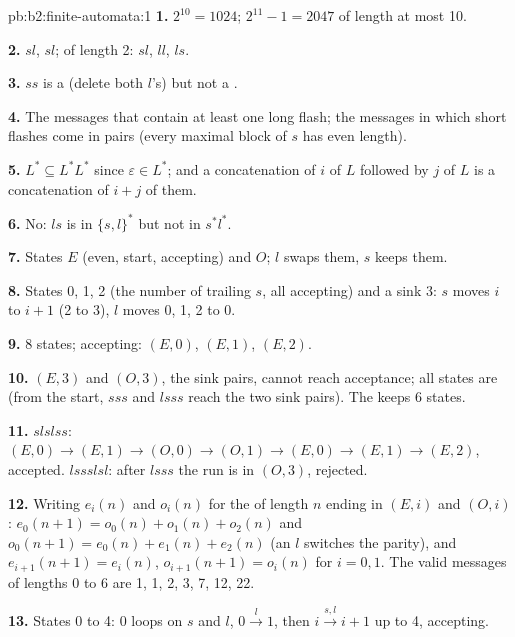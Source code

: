 \begin{solution}{pb:b2:finite-automata:1}
\textbf{1.} $2^{10} = 1024$; $2^{11} - 1 = 2047$ of length at most 10.

\textbf{2.}  $sl$,  $sl$;  of length 2: $sl$, $ll$, $ls$.

\textbf{3.} $ss$ is a  (delete both $l$'s) but not a .

\textbf{4.} The messages that contain at least one long flash; the messages in which short flashes come in pairs
(every maximal block of $s$ has even length).

\textbf{5.} $L^* \subseteq L^* L^*$ since $\varepsilon \in L^*$; and a concatenation of $i$  of $L$ followed by
$j$  of $L$ is a concatenation of $i + j$ of them.

\textbf{6.} No: $ls$ is in $\{s, l\}^*$ but not in $s^* l^*$.

\textbf{7.} States $E$ (even, start, accepting) and $O$; $l$ swaps them, $s$ keeps them.

\textbf{8.} States 0, 1, 2 (the number of trailing $s$, all accepting) and a sink 3: $s$ moves $i$ to $i + 1$ (2 to
3), $l$ moves 0, 1, 2 to 0.

\textbf{9.} 8 states; accepting: $(E, 0)$, $(E, 1)$, $(E, 2)$.

\textbf{10.} $(E, 3)$ and $(O, 3)$, the sink pairs, cannot reach acceptance; all states are  (from the
start, $sss$ and $lsss$ reach the two sink pairs). The  keeps 6 states.

\textbf{11.} $slslss$: $(E,0) \to (E,1) \to (O,0) \to (O,1) \to (E,0) \to (E,1) \to (E,2)$, accepted. $lssslsl$:
after $lsss$ the run is in $(O, 3)$, rejected.

\textbf{12.} Writing $e_i(n)$ and $o_i(n)$ for the  of length $n$ ending in $(E, i)$ and $(O, i)$:
$e_0(n+1) = o_0(n) + o_1(n) + o_2(n)$ and $o_0(n+1) = e_0(n) + e_1(n) + e_2(n)$ (an $l$ switches the parity), and
$e_{i+1}(n+1) = e_i(n)$, $o_{i+1}(n+1) = o_i(n)$ for $i = 0, 1$. The valid messages of lengths 0 to 6 are 1, 1, 2, 3,
7, 12, 22.

\textbf{13.} States 0 to 4: 0 loops on $s$ and $l$, $0 \xrightarrow{l} 1$, then $i \xrightarrow{s, l} i + 1$ up to 4,
accepting.


\end{solution}
